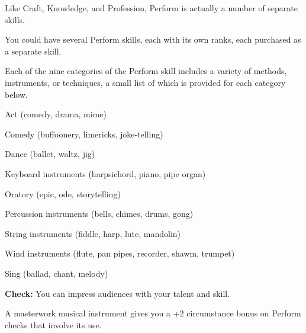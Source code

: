 Like Craft, Knowledge, and Profession, Perform is actually a number of separate skills.

You could have several Perform skills, each with its own ranks, each purchased as a separate skill.

Each of the nine categories of the Perform skill includes a variety of methods, instruments, or techniques, a small list of which is provided for each category below.

\begin{itemize*}
\item Act (comedy, drama, mime)
\item Comedy (buffoonery, limericks, joke-telling)
\item Dance (ballet, waltz, jig)
\item Keyboard instruments (harpsichord, piano, pipe organ)
\item Oratory (epic, ode, storytelling)
\item Percussion instruments (bells, chimes, drums, gong)
\item String instruments (fiddle, harp, lute, mandolin)
\item Wind instruments (flute, pan pipes, recorder, shawm, trumpet)
\item Sing (ballad, chant, melody)
\end{itemize*}

\textbf{Check:} You can impress audiences with your talent and skill.


A masterwork musical instrument gives you a +2 circumstance bonus on Perform checks that involve its use.

